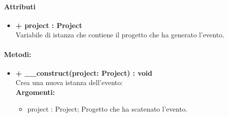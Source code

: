\paragraph{Attributi}
\begin{itemize}
	\item \textbf{+ project : Project}\\
	Variabile di istanza che contiene il progetto che ha generato l'evento.   
\end{itemize}

\paragraph{Metodi:}
\begin{itemize}
	\item \textbf{+ \_\_construct(project: Project) : void}\\
	Crea una nuova istanza dell'evento:\\
	\textbf{Argomenti:}
	\begin{itemize}
		\item project : Project;
		Progetto che ha scatenato l'evento.
	\end{itemize}
\end{itemize}
